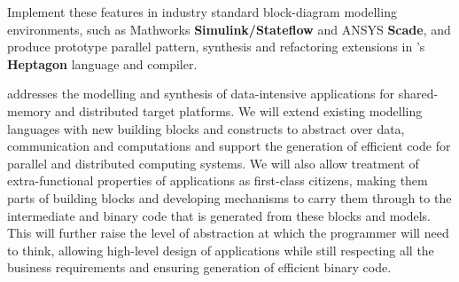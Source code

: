 \begin{Workpackage}{\thewpno}
\begin{WPObjectives}
\begin{compactitem}
\item Implement these features in industry standard block-diagram
  modelling environments, such as Mathworks \textbf{Simulink/Stateflow} and
  ANSYS \textbf{Scade}, and produce prototype parallel pattern, synthesis and
  refactoring extensions in \INRIAshort{}'s \textbf{Heptagon} language and compiler.
\end{compactitem}
\end{WPObjectives}

\begin{WPDescription}
\theWP{} addresses the modelling and synthesis of data-intensive applications for shared-memory and distributed target platforms. We will extend existing modelling
languages with new building blocks and constructs to abstract over data, communication and computations and support the generation of efficient code for parallel and distributed computing systems. 
We will also allow treatment of extra-functional properties of applications as first-class citizens, making them parts of building blocks and developing mechanisms to carry them through to the intermediate and binary code that is generated from these blocks and models. 
This will further raise the level of abstraction at
which the programmer will need to think, allowing high-level design of applications while still respecting all the business requirements and ensuring generation of efficient
binary code. 
\end{WPDescription}

\begin{Task}


\end{Task}
\end{Workpackage}
